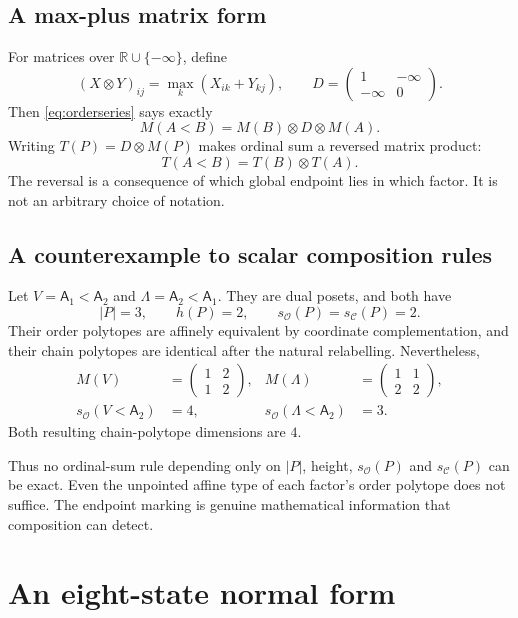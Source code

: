 \documentclass[11pt]{article}
\theoremstyle{definition}
\newcommand{\OO}{\mathcal O}
\newcommand{\CC}{\mathcal C}
\newcommand{\sO}{s_{\OO}}
\newcommand{\sC}{s_{\CC}}
\newcommand{\RR}{\mathbb R}
\newcommand{\A}[1]{\mathsf A_{#1}}
\begin{document}
\subsection{A max-plus matrix form}
For matrices over $\RR\cup\{-\infty\}$, define
\[
(X\otimes Y)_{ij}=\max_k(X_{ik}+Y_{kj}),
\qquad D=\begin{pmatrix}1&-\infty\\-\infty&0\end{pmatrix}.
\]
Then \eqref{eq:orderseries} says exactly
\begin{equation}\label{eq:maxplus}
M(A<B)=M(B)\otimes D\otimes M(A).
\end{equation}
Writing $T(P)=D\otimes M(P)$ makes ordinal sum a reversed matrix product:
\[
T(A<B)=T(B)\otimes T(A).
\]
The reversal is a consequence of which global endpoint lies in which factor. It is not an arbitrary choice of notation.

\subsection{A counterexample to scalar composition rules}\label{sec:counterexample}
Let $V=\A1<\A2$ and $\Lambda=\A2<\A1$. They are dual posets, and both have
\[
|P|=3,\qquad h(P)=2,\qquad \sO(P)=\sC(P)=2.
\]
Their order polytopes are affinely equivalent by coordinate complementation, and their chain polytopes are identical after the natural relabelling. Nevertheless,
\begin{align*}
M(V)&=\begin{pmatrix}1&2\\1&2\end{pmatrix},&
M(\Lambda)&=\begin{pmatrix}1&1\\2&2\end{pmatrix},\\
\sO(V<\A2)&=4,&\sO(\Lambda<\A2)&=3.
\end{align*}
Both resulting chain-polytope dimensions are $4$.

Thus no ordinal-sum rule depending only on $|P|$, height, $\sO(P)$ and $\sC(P)$ can be exact. Even the unpointed affine type of each factor's order polytope does not suffice. The endpoint marking is genuine mathematical information that composition can detect.

\section{An eight-state normal form}\label{sec:states}
\end{document}
